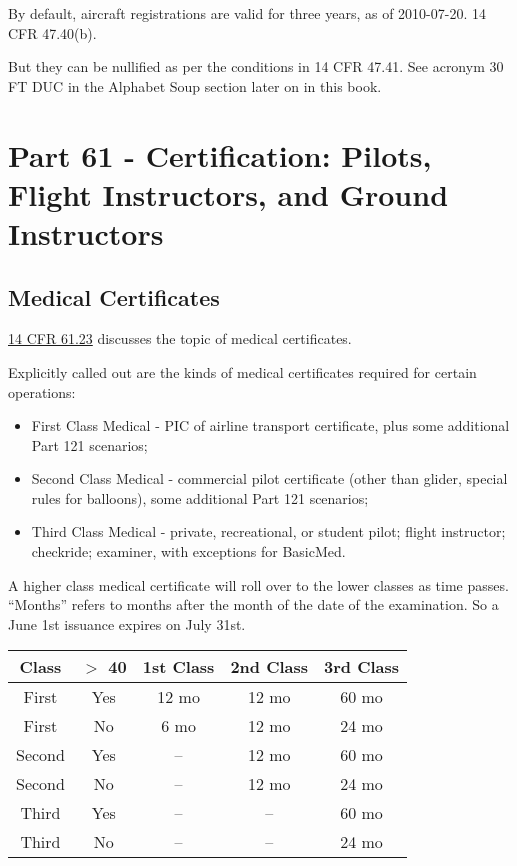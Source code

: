 By default, aircraft registrations are valid for three years, as of 2010-07-20. 14 CFR 47.40(b).

But they can be nullified as per the conditions in 14 CFR 47.41. See acronym 30 FT DUC in the Alphabet Soup section later on in this book.

\section{Part 61 - Certification: Pilots, Flight Instructors, and Ground Instructors}

\subsection{Medical Certificates}

\href{https://www.ecfr.gov/current/title-14/chapter-I/subchapter-D/part-61/subpart-A/section-61.23}{14 CFR 61.23} discusses the topic of medical certificates.

Explicitly called out are the kinds of medical certificates required for certain operations:

\begin{itemize}
\item First Class Medical - PIC of airline transport certificate, plus some additional Part 121 scenarios;
\item Second Class Medical - commercial pilot certificate (other than glider, special rules for balloons), some additional Part 121 scenarios;
\item Third Class Medical - private, recreational, or student pilot; flight instructor; checkride; examiner, with exceptions for BasicMed.
\end{itemize}

A higher class medical certificate will roll over to the lower classes as time passes. ``Months'' refers to months after the month of the date of the examination. So a June 1st issuance expires on July 31st.

\begin{center}
\begin{tabular}{ |c|c|c|c|c| }
\hline
Class & $>$ 40 & 1st Class & 2nd Class & 3rd Class \\
\hline
First & Yes      & 12 mo & 12 mo & 60 mo \\
First & No       &  6 mo & 12 mo & 24 mo \\
\hline
Second & Yes     & --        & 12 mo & 60 mo \\
Second & No      & --        & 12 mo & 24 mo \\
\hline
Third & Yes      & --        & --        & 60 mo \\
Third & No       & --        & --        & 24 mo \\
\hline
\end{tabular}
\end{center}



